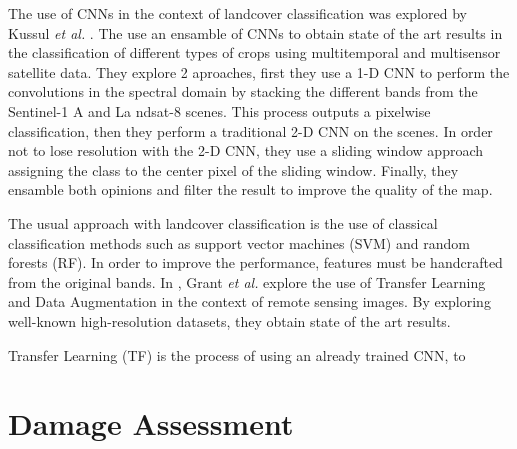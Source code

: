 The use of CNNs in the context of landcover classification was explored by Kussul \textit{et al.} \cite{kussul}. The use an ensamble of CNNs to obtain state of the art results in the classification of different types of crops using multitemporal and multisensor satellite data. They explore 2 aproaches, first they use a 1-D CNN to perform the convolutions in the spectral domain by stacking the different bands from the Sentinel-1 A and La ndsat-8 scenes. This process outputs a pixelwise classification, then they perform a traditional 2-D CNN on the scenes. In order not to lose resolution with the 2-D CNN, they use a sliding window approach assigning the class to the center pixel of the sliding window. Finally, they ensamble both opinions and filter the result to improve the quality of the map.

The usual approach with landcover classification is the use of classical classification methods such as support vector machines (SVM) and random forests (RF). In order to improve the performance, features must be handcrafted from the original bands. In \cite{scott}, Grant \textit{et al.} explore the use of Transfer Learning and Data Augmentation in the context of remote sensing images. By exploring well-known high-resolution datasets, they obtain state of the art results. 

Transfer Learning (TF) is the process of using an already trained CNN, to 

\section{Damage Assessment}
